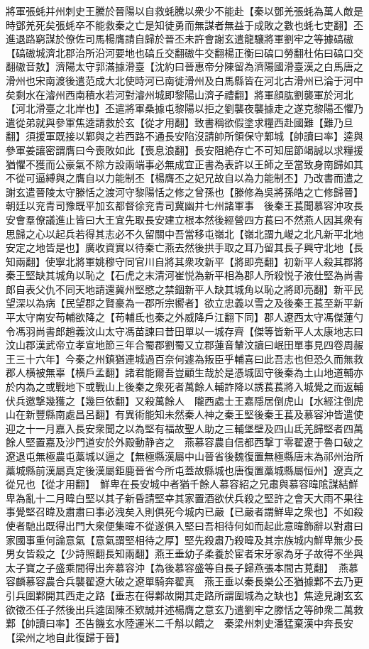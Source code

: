 將軍張蚝并州刺史王騰於晉陽以自救蚝騰以衆少不能赴【秦以鄧羌張蚝為萬人敵是時鄧羌死矣張蚝卒不能救秦之亡是知徒勇而無謀者無益于成敗之數也蚝七吏翻】丕進退路窮謀於僚佐司馬楊膺請自歸於晉丕未許會謝玄遣龍驤將軍劉牢之等據碻磝【碻磝城濟北郡治所沿河要地也碻丘交翻磝牛交翻楊正衡曰碻口勞翻杜佑曰碻口交翻磝音敖】濟陽太守郭滿據滑臺【沈約曰晉惠帝分陳留為濟陽國滑臺漢之白馬唐之滑州也宋南渡後遣范成大北使時河已南徙滑州及白馬縣皆在河北古滑州已淪于河中矣剩水在濬州西南積水若河對濬州城即黎陽山濟子禮翻】將軍顔肱劉襲軍於河北【河北滑臺之北岸也】丕遣將軍桑據屯黎陽以拒之劉襲夜襲據走之遂克黎陽丕懼乃遣從弟就與參軍焦逵請救於玄【從才用翻】致書稱欲假塗求糧西赴國難【難乃旦翻】須援軍既接以鄴與之若西路不通長安陷沒請帥所領保守鄴城【帥讀曰率】逵與參軍姜讓密謂膺曰今喪敗如此【喪息浪翻】長安阻絶存亡不可知屈節竭誠以求糧援猶懼不獲而公豪氣不除方設兩端事必無成宜正書為表許以王師之至當致身南歸如其不從可逼縛與之膺自以力能制丕【楊膺丕之妃兄故自以為力能制丕】乃改書而遣之　謝玄遣晉陵太守滕恬之渡河守黎陽恬之修之曾孫也【滕修為吳將孫皓之亡修歸晉】朝廷以兖青司豫既平加玄都督徐兖青司冀幽并七州諸軍事　後秦王萇聞慕容沖攻長安會羣僚議進止皆曰大王宜先取長安建立根本然後經營四方萇曰不然燕人因其衆有思歸之心以起兵若得其志必不久留關中吾當移屯嶺北【嶺北謂九嵕之北凡新平北地安定之地皆是也】廣收資實以待秦亡燕去然後拱手取之耳乃留其長子興守北地【長知兩翻】使寧北將軍姚穆守同官川自將其衆攻新平【將即亮翻】初新平人殺其郡將秦王堅缺其城角以恥之【石虎之末清河崔悦為新平相為郡人所殺悦子液仕堅為尚書郎自表父仇不同天地請還冀州堅愍之禁錮新平人缺其城角以恥之將即亮翻】新平民望深以為病【民望郡之賢豪為一郡所宗嚮者】欲立忠義以雪之及後秦王萇至新平新平太守南安苟輔欲降之【苟輔氐也秦之外威降戶江翻下同】郡人遼西太守馮傑蓮勺令馮羽尚書郎趙義汶山太守馮苗諫曰昔田單以一城存齊【傑等皆新平人太康地志曰汶山郡漢武帝立孝宣地節三年合蜀郡劉蜀又立郡蓮音輦汶讀曰岷田單事見四卷周赧王三十六年】今秦之州鎮猶連城過百奈何遽為叛臣乎輔喜曰此吾志也但恐久而無救郡人横被無辜【横戶孟翻】諸君能爾吾豈顧生哉於是憑城固守後秦為土山地道輔亦於内為之或戰地下或戰山上後秦之衆死者萬餘人輔詐降以誘萇萇將入城覺之而返輔伏兵邀撃幾獲之【幾巨依翻】又殺萬餘人　隴西處士王嘉隱居倒虎山【水經注倒虎山在新豐縣南處昌呂翻】有異術能知未然秦人神之秦王堅後秦王萇及慕容沖皆遣使迎之十一月嘉入長安衆聞之以為堅有福故聖人助之三輔堡壁及四山氐羌歸堅者四萬餘人堅置嘉及沙門道安於外殿動静咨之　燕慕容農自信都西撃丁零翟遼于魯口破之遼退屯無極農屯藁城以逼之【無極縣漢屬中山晉省後魏復置無極縣唐末為祁州治所藁城縣前漢屬真定後漢屬鉅鹿晉省今所屯蓋故縣城也唐復置藁城縣屬恒州】遼真之從兄也【從才用翻】　鮮卑在長安城中者猶千餘人慕容紹之兄肅與慕容暐隂謀結鮮卑為亂十二月暐白堅以其子新昏請堅幸其家置酒欲伏兵殺之堅許之會天大雨不果往事覺堅召暐及肅肅曰事必洩矣入則俱死今城内已嚴【已嚴者謂鮮卑之衆也】不如殺使者馳出既得出門大衆便集暐不從遂俱入堅曰吾相待何如而起此意暐飾辭以對肅曰家國事重何論意氣【意氣謂堅相待之厚】堅先殺肅乃殺暐及其宗族城内鮮卑無少長男女皆殺之【少詩照翻長知兩翻】燕王垂幼子柔養於宦者宋牙家為牙子故得不坐與太子寶之子盛乘間得出奔慕容沖【為後慕容盛等自長子歸燕張本間古莧翻】　燕慕容麟慕容農合兵襲翟遼大破之遼單騎奔翟真　燕王垂以秦長樂公丕猶據鄴不去乃更引兵圍鄴開其西走之路【垂志在得鄴故開其走路所謂圍城為之缺也】焦逵見謝玄玄欲徵丕任子然後出兵逵固陳丕欵誠并述楊膺之意玄乃遣劉牢之滕恬之等帥衆二萬救鄴【帥讀曰率】丕告饑玄水陸運米二千斛以饋之　秦梁州刺史潘猛棄漢中奔長安【梁州之地自此復歸于晉】

